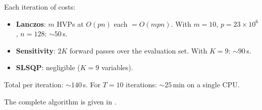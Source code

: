 \documentclass[11pt,a4paper]{article}
\begin{document}
Each iteration of  costs:
\begin{itemize}
    \item \textbf{Lanczos}: $m$ HVPs at $O(pn)$ each $= O(mpn)$.
      With $m{=}10$, $p{=}23{\times}10^6$, $n{=}128$: ${\sim}50$\,s.
    \item \textbf{Sensitivity}: $2K$ forward passes over the
      evaluation set. With $K{=}9$: ${\sim}90$\,s.
    \item \textbf{SLSQP}: negligible ($K{=}9$ variables).
\end{itemize}
Total per iteration: ${\sim}140$\,s. For $T{=}10$ iterations:
${\sim}25$\,min on a single CPU.


The complete algorithm is given in .

\bigskip
\end{document}
